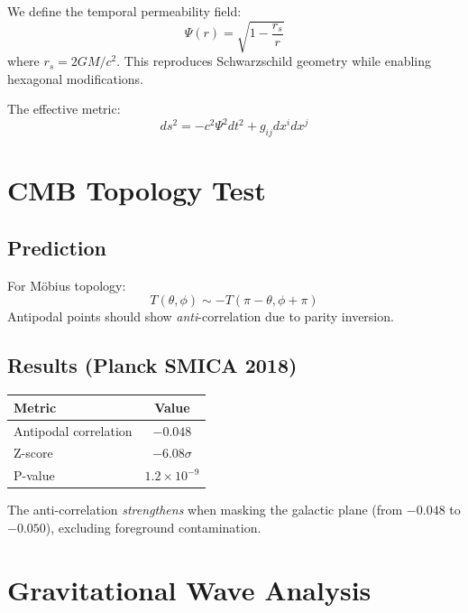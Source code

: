 \documentclass[aps,prl,twocolumn,superscriptaddress]{revtex4-2}
\begin{document}
We define the temporal permeability field:
\begin{equation}
\Psi(r) = \sqrt{1 - \frac{r_s}{r}}
\end{equation}
where $r_s = 2GM/c^2$. This reproduces Schwarzschild geometry while enabling hexagonal modifications.

The effective metric:
\begin{equation}
ds^2 = -c^2\Psi^2 dt^2 + g_{ij}dx^i dx^j
\end{equation}

\section{CMB Topology Test}

\subsection{Prediction}

For M\"obius topology:
\begin{equation}
T(\theta, \phi) \sim -T(\pi - \theta, \phi + \pi)
\end{equation}
Antipodal points should show \textit{anti}-correlation due to parity inversion.

\subsection{Results (Planck SMICA 2018)}

\begin{table}[h]
\begin{ruledtabular}
\begin{tabular}{lc}
Metric & Value \\
\hline
Antipodal correlation & $-0.048$ \\
Z-score & $-6.08\sigma$ \\
P-value & $1.2 \times 10^{-9}$ \\
\end{tabular}
\end{ruledtabular}
\end{table}

The anti-correlation \textit{strengthens} when masking the galactic plane (from $-0.048$ to $-0.050$), excluding foreground contamination.

\section{Gravitational Wave Analysis}
\end{document}
